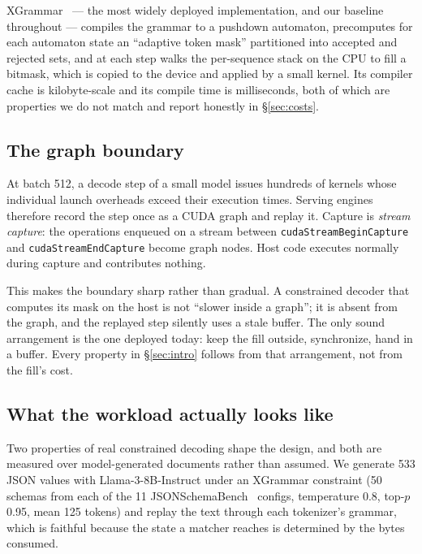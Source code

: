 \documentclass{article}
\begin{document}
XGrammar~\cite{dong2024xgrammar} --- the most widely deployed implementation,
and our baseline throughout --- compiles the grammar to a pushdown automaton,
precomputes for each automaton state an ``adaptive token mask'' partitioned into
accepted and rejected sets, and at each step walks the per-sequence stack on the
CPU to fill a bitmask, which is copied to the device and applied by a small
kernel. Its compiler cache is kilobyte-scale and its compile time is
milliseconds, both of which are properties we do not match and report honestly
in \S\ref{sec:costs}.

\subsection{The graph boundary}

At batch 512, a decode step of a small model issues hundreds of kernels whose
individual launch overheads exceed their execution times. Serving engines
therefore record the step once as a CUDA graph and replay it. Capture is
\emph{stream capture}: the operations enqueued on a stream between
\texttt{cudaStreamBeginCapture} and \texttt{cudaStreamEndCapture} become graph
nodes. Host code executes normally during capture and contributes nothing.

This makes the boundary sharp rather than gradual. A constrained decoder that
computes its mask on the host is not ``slower inside a graph''; it is absent
from the graph, and the replayed step silently uses a stale buffer. The only
sound arrangement is the one deployed today: keep the fill outside, synchronize,
hand in a buffer. Every property in \S\ref{sec:intro} follows from that
arrangement, not from the fill's cost.

\subsection{What the workload actually looks like}

Two properties of real constrained decoding shape the design, and both are
measured over model-generated documents rather than assumed. We generate 533
JSON values with Llama-3-8B-Instruct under an XGrammar constraint (50 schemas
from each of the 11 JSONSchemaBench~\cite{geng2025jsonschemabench} configs,
temperature 0.8, top-$p$ 0.95, mean 125 tokens) and replay the text through
each tokenizer's grammar, which is faithful because the state a matcher reaches
is determined by the bytes consumed.
\end{document}
